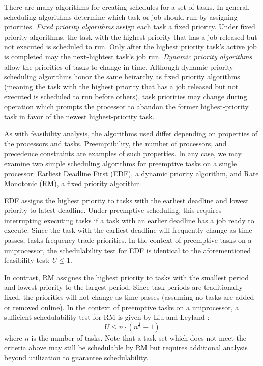 There are many algorithms for creating schedules for a set of tasks.
In general, scheduling algorithms determine which task or job should run by assigning priorities.
\textit{Fixed priority algorithms} assign each task a fixed priority.
Under fixed priority algorithms, the task with the highest priority that has a job released but not executed is scheduled to run.
Only after the highest priority task's active job is completed may the next-hightest task's job run.
\textit{Dynamic priority algorithms} allow the priorities of tasks to change in time.
Although dynamic priority scheduling algorithms honor the same heirarchy as fixed priority algorithms (meaning the task with the highest priority that has a job released but not executed is scheduled to run before others), task priorities may change during operation which prompts the processor to abandon the former highest-priority task in favor of the newest highest-priority task.

As with feasibility analysis, the algorithms used differ depending on properties of the processors and tasks.
Preemptibility, the number of processors, and precedence constraints are examples of such properties.
In any case, we may examine two simple scheduling algorithms for preemptive tasks on a single processor: Earliest Deadline First (EDF), a dynamic priority algorithm, and Rate Monotonic (RM), a fixed priority algorithm.

EDF assigns the highest priority to tasks with the earliest deadline and lowest priority to latest deadline.
Under preemptive scheduling, this requires interrupting executing tasks if a task with an earlier deadline has a job ready to execute.
Since the task with the earliest deadline will frequently change as time passes, tasks frequency trade priorities.
In the context of preemptive tasks on a uniprocessor, the schedulability test for EDF is identical to the aforementioned feasibility test: $U \leq 1$.

In contrast, RM assignes the highest priority to tasks with the smallest period and lowest priority to the largest period.
Since task periods are traditionally fixed, the priorities will not change as time passes (assuming no tasks are added or removed online).
In the context of preemptive tasks on a uniprocessor, a sufficient schedulability test for RM is given by Liu and Leyland \cite{liu_scheduling_1973}:
\begin{equation}
    U \leq n \cdot (n^{\frac{1}{n}}-1)
\end{equation}
where $n$ is the number of tasks.
Note that a task set which does not meet the criteria above may still be schedulable by RM but requires additional analysis beyond utilization to guarantee schedulability.

